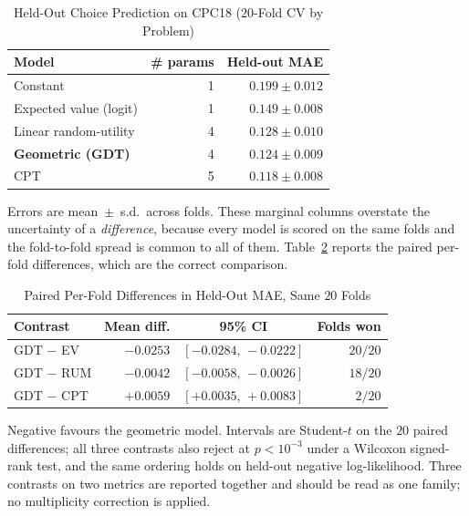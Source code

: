 \documentclass[journal]{IEEEtran}
\begin{document}
\begin{table}[!t]
\renewcommand{\arraystretch}{1.15}
\caption{Held-Out Choice Prediction on CPC18 ($20$-Fold CV by Problem)}
\label{tab:cpc18}
\centering
\begin{tabular}{l r r}
\toprule
\textbf{Model} & \textbf{\# params} & \textbf{Held-out MAE} \\
\midrule
Constant                 & 1 & $0.199 \pm 0.012$ \\
Expected value (logit)   & 1 & $0.149 \pm 0.008$ \\
Linear random-utility    & 4 & $0.128 \pm 0.010$ \\
\textbf{Geometric (GDT)} & 4 & $\mathbf{0.124 \pm 0.009}$ \\
CPT                      & 5 & $0.118 \pm 0.008$ \\
\bottomrule
\end{tabular}
\begin{flushleft}
\footnotesize{Errors are mean~$\pm$~s.d.\ across folds. These marginal columns overstate the uncertainty of a \emph{difference}, because every model is scored on the same folds and the fold-to-fold spread is common to all of them. Table~\ref{tab:cpc18paired} reports the paired per-fold differences, which are the correct comparison.}
\end{flushleft}
\end{table}

\begin{table}[!t]
\renewcommand{\arraystretch}{1.15}
\caption{Paired Per-Fold Differences in Held-Out MAE, Same $20$ Folds}
\label{tab:cpc18paired}
\centering
\begin{tabular}{l r c r}
\toprule
\textbf{Contrast} & \textbf{Mean diff.} & \textbf{95\% CI} & \textbf{Folds won} \\
\midrule
GDT $-$ EV  & $-0.0253$ & $[-0.0284,\,-0.0222]$ & $20/20$ \\
GDT $-$ RUM & $-0.0042$ & $[-0.0058,\,-0.0026]$ & $18/20$ \\
GDT $-$ CPT & $+0.0059$ & $[+0.0035,\,+0.0083]$ & $2/20$ \\
\bottomrule
\end{tabular}
\begin{flushleft}
\footnotesize{Negative favours the geometric model. Intervals are Student-$t$ on the $20$ paired differences; all three contrasts also reject at $p<10^{-3}$ under a Wilcoxon signed-rank test, and the same ordering holds on held-out negative log-likelihood. Three contrasts on two metrics are reported together and should be read as one family; no multiplicity correction is applied.}
\end{flushleft}
\end{table}
\end{document}

